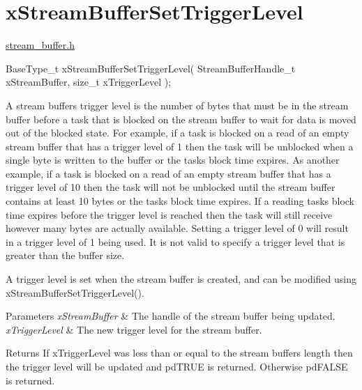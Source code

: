 \hypertarget{group__x_stream_buffer_set_trigger_level}{}\section{x\+Stream\+Buffer\+Set\+Trigger\+Level}
\label{group__x_stream_buffer_set_trigger_level}
\mbox{\hyperlink{stream__buffer_8h_source}{stream\+\_\+buffer.\+h}}


\begin{DoxyPre}
BaseType\_t xStreamBufferSetTriggerLevel( StreamBufferHandle\_t xStreamBuffer, size\_t xTriggerLevel );
\end{DoxyPre}


A stream buffer\textquotesingle{}s trigger level is the number of bytes that must be in the stream buffer before a task that is blocked on the stream buffer to wait for data is moved out of the blocked state. For example, if a task is blocked on a read of an empty stream buffer that has a trigger level of 1 then the task will be unblocked when a single byte is written to the buffer or the task\textquotesingle{}s block time expires. As another example, if a task is blocked on a read of an empty stream buffer that has a trigger level of 10 then the task will not be unblocked until the stream buffer contains at least 10 bytes or the task\textquotesingle{}s block time expires. If a reading task\textquotesingle{}s block time expires before the trigger level is reached then the task will still receive however many bytes are actually available. Setting a trigger level of 0 will result in a trigger level of 1 being used. It is not valid to specify a trigger level that is greater than the buffer size.

A trigger level is set when the stream buffer is created, and can be modified using x\+Stream\+Buffer\+Set\+Trigger\+Level().


\begin{DoxyParams}{Parameters}
{\em x\+Stream\+Buffer} & The handle of the stream buffer being updated.\\
\hline
{\em x\+Trigger\+Level} & The new trigger level for the stream buffer.\\
\hline
\end{DoxyParams}
\begin{DoxyReturn}{Returns}
If x\+Trigger\+Level was less than or equal to the stream buffer\textquotesingle{}s length then the trigger level will be updated and pd\+T\+R\+UE is returned. Otherwise pd\+F\+A\+L\+SE is returned. 
\end{DoxyReturn}
